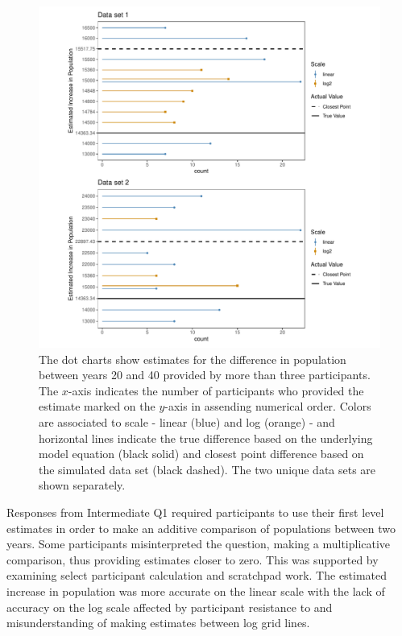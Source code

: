\documentclass[print]{nuthesis}
\begin{document}
\begin{figure}[tbp]

{\centering \includegraphics[width=1\linewidth,]{thesis_files/figure-latex/qi1-common-responses-1} 

}

\caption[Intermediate Q1 common responses]{The dot charts show estimates for the difference in population between years 20 and 40 provided by more than three participants. The $x$-axis indicates the number of participants who provided the estimate marked on the $y$-axis in assending numerical order. Colors are associated to scale - linear (blue) and log (orange) - and horizontal lines indicate the true difference based on the underlying model equation (black solid) and closest point difference based on the simulated data set (black dashed). The two unique data sets are shown separately.}\label{fig:qi1-common-responses}
\end{figure}

Responses from Intermediate Q1 required participants to use their first level estimates in order to make an additive comparison of populations between two years.
Some participants misinterpreted the question, making a multiplicative comparison, thus providing estimates closer to zero.
This was supported by examining select participant calculation and scratchpad work.
The estimated increase in population was more accurate on the linear scale with the lack of accuracy on the log scale affected by participant resistance to and misunderstanding of making estimates between log grid lines.
\end{document}
